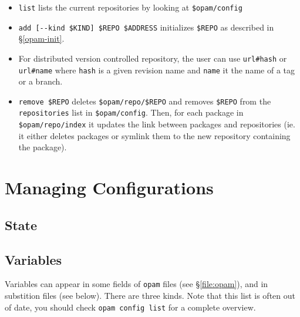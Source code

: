 \documentclass[a4paper,10pt]{article}
\begin{document}
\begin{itemize}
\item \verb+list+ lists the current repositories by looking at
  \verb+$opam/config+

\item \verb+add [--kind $KIND] $REPO $ADDRESS+ initializes
  \verb+$REPO+ as described in \S\ref{opam-init}.

\item For distributed version controlled repository, the user can use
  \verb+url#hash+ or \verb+url#name+ where {\tt hash} is a given
  revision name and {\tt name} it the name of a tag or a branch.

\item \verb+remove $REPO+ deletes \verb+$opam/repo/$REPO+ and removes
  \verb+$REPO+ from the {\tt repositories} list in \verb+$opam/config+.
  Then, for each package in \verb+$opam/repo/index+ it updates the link
  between packages and repositories (ie. it either deletes packages or
  symlink them to the new repository containing the package).

\end{itemize}

\section{Managing Configurations}
\label{section:config}

\subsection{State}

\subsection{Variables}
\label{subsection:variables}

Variables can appear in some fields of {\tt opam} files (see \S\ref{file:opam}),
and in substition files (see below). There are three kinds. Note that this list
is often out of date, you should check \verb+opam config list+ for a complete
overview.
\end{document}
